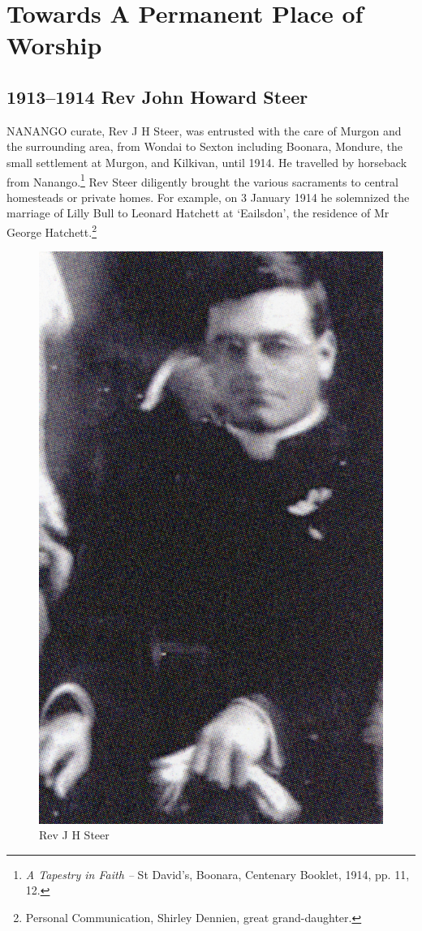 \balance


\printendnotes[custom]
\setcounter{endnote}{0}
\chapter{Towards A Permanent Place of Worship}
\nobalance


\section{1913--1914 Rev John Howard Steer}



\lettrine[lines=3]{N}{ANANGO}
 curate, Rev J H Steer, was entrusted with the care of Murgon and the surrounding area, from Wondai to Sexton including Boonara, Mondure, the small settlement at Murgon, and Kilkivan, until 1914. He travelled by horseback from Nanango.\footnote{\emph{A Tapestry in Faith --} St David's, Boonara, Centenary Booklet, 1914, pp. 11, 12.} Rev Steer diligently brought the various sacraments to central homesteads or private homes. For example, on 3 January 1914 he solemnized the marriage of Lilly Bull to Leonard Hatchett at `Eailsdon', the residence of Mr George Hatchett.\footnote{Personal Communication, Shirley Dennien, great grand-daughter.}







\begin{figure}
\begin{center}
\includegraphics[width=.6\linewidth,center]{../images/JHSteer.jpg}
\caption{Rev J H Steer}
\end{center}
\end{figure}




